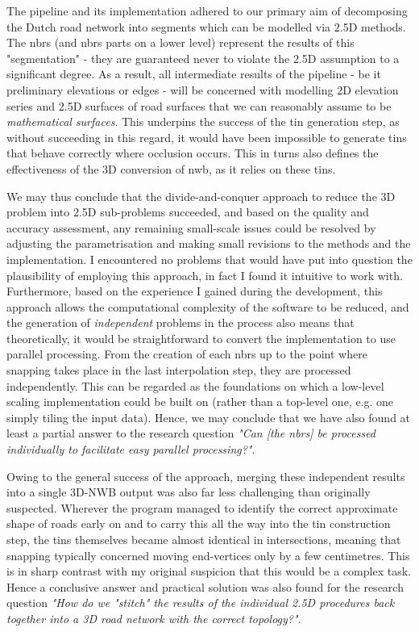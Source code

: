The pipeline and its implementation adhered to our primary aim of decomposing the Dutch road network into segments which can be modelled via 2.5D methods. The \ac{nbrs} (and \ac{nbrs} parts on a lower level) represent the results of this "segmentation" - they are guaranteed never to violate the 2.5D assumption to a significant degree. As a result, all intermediate results of the pipeline - be it preliminary elevations or edges - will be concerned with modelling 2D elevation series and 2.5D surfaces of road surfaces that we can reasonably assume to be \textit{mathematical surfaces}. This underpins the success of the \ac{tin} generation step, as without succeeding in this regard, it would have been impossible to generate \ac{tin}s that behave correctly where occlusion occurs. This in turns also defines the effectiveness of the 3D conversion of \ac{nwb}, as it relies on these \ac{tin}s.

We may thus conclude that the divide-and-conquer approach to reduce the 3D problem into 2.5D sub-problems succeeded, and based on the quality and accuracy assessment, any remaining small-scale issues could be resolved by adjusting the parametrisation and making small revisions to the methods and the implementation. I encountered no problems that would have put into question the plausibility of employing this approach, in fact I found it intuitive to work with. Furthermore, based on the experience I gained during the development, this approach allows the computational complexity of the software to be reduced, and the generation of \textit{independent} problems in the process also means that theoretically, it would be straightforward to convert the implementation to use parallel processing. From the creation of each \ac{nbrs} up to the point where snapping takes place in the last interpolation step, they are processed independently. This can be regarded as the foundations on which a low-level scaling implementation could be built on (rather than a top-level one, e.g. one simply tiling the input data). Hence, we may conclude that we have also found at least a partial answer to the research question \textit{"Can [the \ac{nbrs}] be processed individually to facilitate easy parallel processing?"}.

Owing to the general success of the approach, merging these independent results into a single 3D-NWB output was also far less challenging than originally suspected. Wherever the program managed to identify the correct approximate shape of roads early on and to carry this all the way into the \ac{tin} construction step, the \ac{tin}s themselves became almost identical in intersections, meaning that snapping typically concerned moving end-vertices only by a few centimetres. This is in sharp contrast with my original suspicion that this would be a complex task. Hence a conclusive answer and practical solution was also found for the research question \textit{"How do we "stitch" the results of the individual 2.5D procedures back together into a 3D road network with the correct topology?"}.

